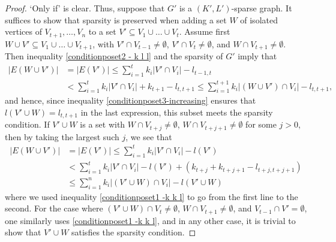 \documentclass[10pt,a4paper]{article}
\newtheorem{rem
ark}[theorem]{Remark}
\begin{document}
\begin{proof}
`Only if' is clear. Thus, suppose that $G'$ is a $(K',L')$-sparse graph. It suffices to show that sparsity is preserved when adding a set $W$ of isolated vertices of $V_{t+1}, \dots, V_n$ to a set $V' \subseteq V_{1}\cup \dots \cup V_t$. Assume first $W\cup V' \subseteq V_1\cup \dots \cup V_{t+1}$, with $V' \cap V_{t-1} \neq \emptyset$, $ V' \cap V_{t}\neq \emptyset$, and $W \cap V_{t+1} \neq \emptyset$. Then inequality \eqref{conditionposet2 - k l l} and the sparsity of $G'$ imply that
\begin{align*}
   \vert E(W\cup V') \vert&= \vert E(V') \vert \leq \sum_{i=1}^{t} k_i \vert V'\cap V_i\vert - l_{t-1,t}\\
&< \sum_{i=1}^{t} k_i \vert V' \cap V_i\vert + k_{t+1} - l_{t, t+1} \leq \sum_{i=1}^{t+1} k_i \vert (W\cup V') \cap V_i\vert - l_{t, t+1}, 
\end{align*}
and hence, since inequality \eqref{conditionposet3-increasing} ensures that $l(V' \cup W)=l_{t, t+1}$ in the last expression, this subset meets the sparsity condition.
If $V' \cup W$ is a set with $W \cap V_{t+j} \neq \emptyset$, $W \cap V_{t+j+1}\neq \emptyset$ for some $j > 0$, then by taking the largest such $j$, we see that 
\begin{align*}
\vert E(W\cup V') \vert&= \vert E(V') \vert \leq \sum_{i=1}^{t} k_i \vert V '\cap V_i\vert - l(V')\\
&<  \sum_{i=1}^{t} k_i \vert V '\cap V_i\vert - l(V') + (k_{t+j} + k_{t+j+1} - l_{t+j, t+j+1}) \\
&\leq \sum_{i=1}^{n} k_i \vert (V'\cup W) \cap V_i\vert - l(V'\cup W)
\end{align*}
where we used inequality \eqref{conditionposet1 -k k l} to go from the first line to the second. For the case where $(V'\cup W) \cap V_{t} \neq \emptyset$, $W \cap V_{t+1}\neq \emptyset$, and $V_{t-1}\cap V'= \emptyset$, one similarly uses  \eqref{conditionposet1 -k k l}, and in any other case, it is trivial to show that $V'\cup W$ satisfies the sparsity condition. 
\end{proof}
\end{document}
